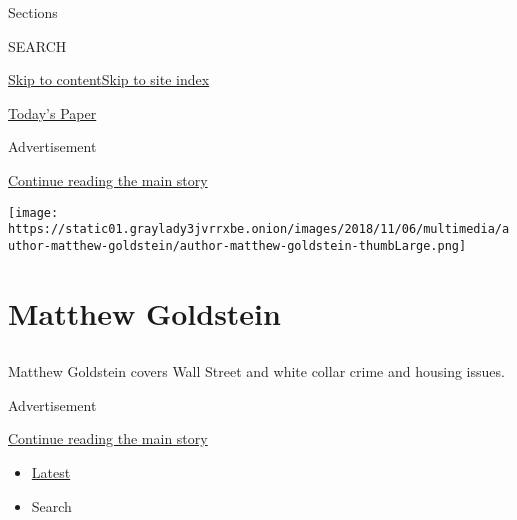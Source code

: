 Sections

SEARCH

\protect\hyperlink{site-content}{Skip to
content}\protect\hyperlink{site-index}{Skip to site index}

\href{https://myaccount.nytimes3xbfgragh.onion/auth/login?response_type=cookie\&client_id=vi}{}

\href{https://www.nytimes3xbfgragh.onion/section/todayspaper}{Today's
Paper}

Advertisement

\protect\hyperlink{after-top}{Continue reading the main story}

\texttt{[image: https://static01.graylady3jvrrxbe.onion/images/2018/11/06/multimedia/author-matthew-goldstein/author-matthew-goldstein-thumbLarge.png]}

\hypertarget{matthew-goldstein}{%
\section{Matthew Goldstein}\label{matthew-goldstein}}

\subsection{}

Matthew Goldstein covers Wall Street and white collar crime and housing
issues.

Advertisement

\protect\hyperlink{after-mid1}{Continue reading the main story}

\begin{itemize}
\tightlist
\item
  \protect\hyperlink{stream-panel}{Latest}
\item
  Search
\end{itemize}

